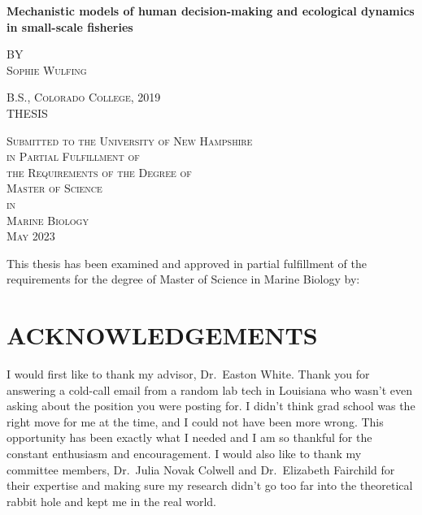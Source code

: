 \documentclass[
]{article}
\author{}
\date{\vspace{-2.5em}}
\begin{document}
\doublespacing


\begin{center}
    
\textbf{\Large Mechanistic models of human decision-making and ecological dynamics in small-scale fisheries}
    
\textsc{BY \\ Sophie Wulfing}
\vspace{3 mm}

\textsc{B.S., Colorado College, 2019 \\ }
\vspace{3 mm}
\textsc{THESIS}

\vspace{3 mm}
\textsc{Submitted to the University of New Hampshire \\ in Partial Fulfillment of \\ the Requirements of the Degree of \\ Master of Science \\ in \\ Marine Biology \\ May 2023}

\end{center}

\newpage

This thesis has been examined and approved in partial fulfillment of the requirements for the
degree of Master of Science in Marine Biology by:


\newpage

\hypertarget{acknowledgements}{%
\section{ACKNOWLEDGEMENTS}\label{acknowledgements}}

I would first like to thank my advisor, Dr.~Easton White. Thank you for answering a cold-call email from a random lab tech in Louisiana who wasn't even asking about the position you were posting for. I didn't think grad school was the right move for me at the time, and I could not have been more wrong. This opportunity has been exactly what I needed and I am so thankful for the constant enthusiasm and encouragement. I would also like to thank my committee members, Dr.~Julia Novak Colwell and Dr.~Elizabeth Fairchild for their expertise and making sure my research didn't go too far into the theoretical rabbit hole and kept me in the real world.
\end{document}
